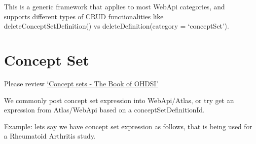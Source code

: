 \documentclass[
]{article}
\begin{document}
This is a generic framework that applies to most WebApi categories, and
supports different types of CRUD functionalities like
deleteConceptSetDefinition() vs deleteDefinition(category =
`conceptSet').

\hypertarget{concept-set}{%
\section{Concept Set}\label{concept-set}}

Please review
\href{https://ohdsi.github.io/TheBookOfOhdsi/Cohorts.html\#conceptSets}{`Concept
sets - The Book of OHDSI'}

We commonly post concept set expression into WebApi/Atlas, or try get an
expression from Atlas/WebApi based on a conceptSetDefinitionId.

Example: lets say we have concept set expression as follows, that is
being used for a Rheumatoid Arthritis study.
\end{document}
